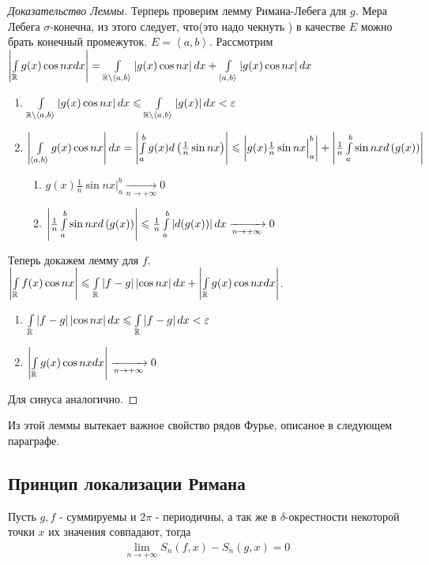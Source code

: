\begin{proof}[Доказательство Леммы]
	Терперь проверим лемму Римана-Лебега для $g$.
	Мера Лебега $\sigma$-конечна, из этого следует, что(это надо чекнуть \todo)
	в качестве $E$ можно брать конечный промежуток.
	$E = \left< a, b\right>$. Рассмотрим $\left|\int\limits_{\mathbb{R}} g(x) \cos nx dx\right| = 
	\int\limits_{\mathbb{R} \setminus \left< a, b \right>} \left|g(x) \cos nx \right|dx +
	\int\limits_{\left<a, b \right>} \left|g(x) \cos nx\right| dx$
	\begin{enumerate}
		\item $\int\limits_{\mathbb{R} \setminus \left< a, b \right>} \left|g(x) \cos nx \right|dx \leqslant 
			\int\limits_{\mathbb{R} \setminus \left< a, b \right>} \left|g(x)\right|dx  < \varepsilon$
		\item $\left|\int\limits_{\left<a, b \right>} g(x) \cos nx\right| dx = 
			\left|\int\limits_{a}^{b} g(x)d\left( \frac{1}{n}\sin nx \right)\right| \leqslant 
			\left|g(x)\frac{1}{n}\sin nx\Big|_{a}^{b}\right| + 
			\left|\frac{1}{n}\int\limits_{a}^{b}\sin nx d\left( g(x)\right)\right|$
			\begin{enumerate}
				\item $g(x)\frac{1}{n}\sin nx\Big|_{a}^{b} \xrightarrow[n \rightarrow +\infty]{} 0$
				\item $\left|\frac{1}{n}\int\limits_{a}^{b}\sin nx d\left( g(x)\right)\right| \leqslant 
					\frac{1}{n} \int\limits_{a}^{b} \left|d(g(x))\right| dx \xrightarrow[n \rightarrow +\infty]{} 0$ 
			\end{enumerate}
	\end{enumerate}

	Теперь докажем лемму для $f$. $\left|\int\limits_{\mathbb{R}}f(x) \cos nx\right| \leqslant 
	\int\limits_{\mathbb{R}}\left|f - g\right|\left|\cos nx\right| dx + \left|\int\limits_{\mathbb{R}} g(x)\cos nx dx\right|$.
	\begin{enumerate}
		\item $\int\limits_{\mathbb{R}}\left|f - g\right|\left|\cos nx\right| dx \leqslant
			\int\limits_{\mathbb{R}}\left|f - g\right| dx < \varepsilon $
		\item $\left|\int\limits_{\mathbb{R}} g(x)\cos nx dx\right| \xrightarrow[n \rightarrow +\infty]{} 0$
	\end{enumerate}
	Для синуса аналогично.
\end{proof}

Из этой леммы вытекает важное свойство рядов Фурье, описаное в следующем параграфе.

\subsection{Принцип локализации Римана}

\begin{theorem}
	Пусть $g, f$ - суммируемы и $2\pi$ - периодичны, а так же в $\delta$-окрестности некоторой точки $x$
	их значения совпадают, тогда 
	\begin{gather*}
		\lim\limits_{n\rightarrow +\infty} S_n(f, x) - S_n(g, x) = 0
	\end{gather*}
\end{theorem}

